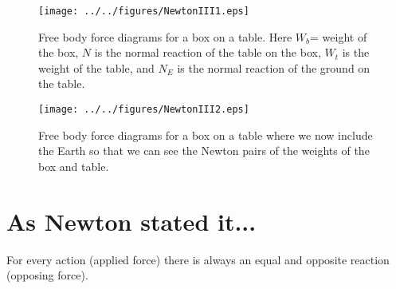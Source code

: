 





\addtolength{\topmargin}{-0.7 cm}
\setlength{\columnsep}{22pt}

\begin{wrapfigure}{r}{8cm}
\center
\texttt{[image: ../../figures/NewtonIII1.eps]}
\caption{Free body force diagrams for a box on a table. Here $W_b$= weight of the box, $N$ is the normal reaction of the table on the box, $W_t$ is the weight of the table, and $N_E$ is the normal reaction of the ground on the table.} \label{NIII1}
\center
\texttt{[image: ../../figures/NewtonIII2.eps]}
\caption{Free body force diagrams for a box on a table where we now include the Earth so that we can see the Newton pairs of the weights of the box and table.} \label{NIII2}
\end{wrapfigure}

\section{As Newton stated it...}
For every action (applied force) there is always an equal and opposite reaction (opposing force).

